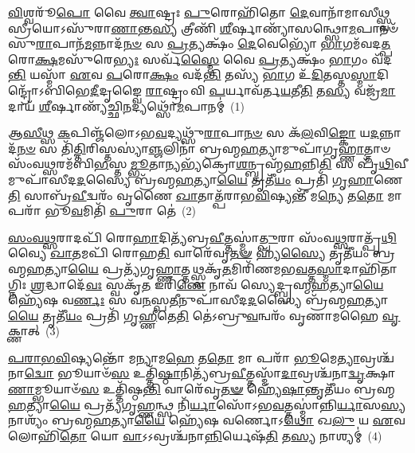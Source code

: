 \setcounter{anuvakam}{0}
\-\ul{𑌵𑌿}\-𑌶𑍍𑌵𑌰𑍂᳴\-\ul{𑌪𑍋} 𑌵𑍈 \ul{𑌤𑍍𑌵𑌾}\-𑌷𑍍𑌟𑍍𑌰𑌃 \ul{𑌪𑍁}\-𑌰𑍋𑌹𑌿᳴𑌤𑍋 \ul{𑌦𑍇}\-𑌵𑌾𑌨𑌾᳴𑌮𑌾𑌸𑍀\-\ul{𑌥𑍍𑌸𑍍𑌵}\-𑌸𑍍𑌰𑍀𑌯𑍋\-𑌽𑌸𑍁᳴𑌰𑌾\-\ul{𑌣𑌾}\-𑌨𑍍𑌤\-\ul{𑌸𑍍𑌯} 𑌤𑍍𑌰𑍀𑌣𑌿᳴ \ul{𑌶𑍀}\-𑌰𑍍\mbox{}𑌷𑌾𑌣𑍍𑌯𑌾᳴𑌸𑌨𑍍𑌥𑍍𑌸𑍋\-\ul{𑌮}\-𑌪𑌾𑌨𑍞᳴ 𑌸𑍁\-\ul{𑌰𑌾}\-𑌪𑌾𑌨᳴\-\ul{𑌮}\-𑌨𑍍𑌨𑌾𑌦᳴\-\ul{𑌨}\-\-\ul{𑍞} 𑌸 \ul{𑌪𑍍𑌰}\-𑌤𑍍𑌯𑌕𑍍𑌷𑌂᳴ \ul{𑌦𑍇}\-𑌵𑍇𑌭𑍍𑌯𑍋᳴ \ul{𑌭𑌾}\-𑌗𑌮᳴𑌵𑌦\-\ul{𑌤𑍍𑌪}\-𑌰𑍋\-\ul{𑌕𑍍𑌷}\-𑌮𑌸𑍁᳴𑌰𑍇\-\ul{𑌭𑍍𑌯𑌃} 𑌸𑌰𑍍𑌵᳴\-\ul{𑌸𑍍𑌮𑍈} 𑌵𑍈 \ul{𑌪𑍍𑌰}\-𑌤𑍍𑌯𑌕𑍍𑌷𑌂᳴ \ul{𑌭𑌾}\-𑌗𑌂 𑌵᳴𑌦\-\ul{𑌨𑍍𑌤𑌿} 𑌯𑌸𑍍𑌮𑌾᳴ \ul{𑌏}\-𑌵 \ul{𑌪}\-𑌰𑍋\-\ul{𑌕𑍍𑌷𑌂} 𑌵𑌦᳴\-\ul{𑌨𑍍𑌤𑌿} 𑌤𑌸𑍍𑌯᳴ \ul{𑌭𑌾}\-𑌗 𑌉᳴\-\ul{𑌦𑌿}\-𑌤𑌸𑍍𑌤\-\ul{𑌸𑍍𑌮𑌾}\-𑌦𑌿𑌨𑍍𑌦𑍍𑌰𑍋᳴\-𑌽𑌬𑌿𑌭𑍇\-\ul{𑌦𑍀}\-𑌦𑍃𑌙𑍍𑌵𑍈 \ul{𑌰𑌾}\-𑌷𑍍𑌟𑍍𑌰𑌂 𑌵𑌿 \ul{𑌪}\-𑌰𑍍𑌯𑌾𑌵᳴𑌰𑍍𑌤\-\ul{𑌯}\-𑌤𑍀\-\ul{𑌤𑌿} 𑌤\-\ul{𑌸𑍍𑌯} 𑌵𑌜𑍍𑌰᳴\-\ul{𑌮𑌾}\-𑌦𑌾𑌯᳴ \ul{𑌶𑍀}\-𑌰𑍍\mbox{}𑌷𑌾𑌣𑍍𑌯᳴𑌚𑍍𑌛𑌿\-\ul{𑌨}\-𑌦𑍍𑌯𑌥𑍍𑌸𑍋᳴\-\ul{𑌮}\-𑌪𑌾𑌨𑌮𑍍॑~(1)

𑌆\-\ul{𑌸𑍀}\-𑌥𑍍𑌸 \ul{𑌕}\-𑌪𑌿𑌞𑍍𑌜᳴𑌲𑍋\-𑌽𑌭\-\ul{𑌵}\-𑌦𑍍𑌯𑌥𑍍𑌸𑍁᳴\-\ul{𑌰𑌾}\-𑌪𑌾\-\ul{𑌨}\-\-\ul{𑍞} 𑌸 𑌕᳴\-\ul{𑌲}\-𑌵𑌿\-\ul{𑌙𑍍𑌕𑍋} 𑌯\-\ul{𑌦}\-𑌨𑍍𑌨𑌾𑌦᳴\-\ul{𑌨}\-\-\ul{𑍞} 𑌸 𑌤𑌿᳴\-\ul{𑌤𑍍𑌤𑌿}\-𑌰𑌿𑌸𑍍𑌤𑌸𑍍𑌯𑌾॑\-\ul{𑌞𑍍𑌜}\-𑌲𑌿𑌨𑌾॑ 𑌬𑍍𑌰𑌹𑍍𑌮\-\ul{𑌹}\-𑌤𑍍𑌯𑌾𑌮𑍁𑌪𑌾᳴𑌗𑍃\-\ul{𑌹𑍍𑌣𑌾}\-𑌤𑍍𑌤𑌾𑍞 𑌸𑌂᳴𑌵\-\ul{𑌥𑍍𑌸}\-𑌰𑌮᳴𑌬𑌿\-\ul{𑌭}\-𑌸𑍍𑌤\-\ul{𑌮𑍍𑌭𑍂}\-𑌤𑌾\-\ul{𑌨𑍍𑌯}\-𑌭𑍍𑌯᳴𑌕𑍍𑌰𑍋\-\ul{𑌶}\-𑌨𑍍𑌬𑍍𑌰𑌹𑍍𑌮᳴\-\ul{𑌹}\-𑌨𑍍𑌨𑌿\-\ul{𑌤𑌿} 𑌸 𑌪𑍃᳴\-\ul{𑌥𑌿}\-𑌵𑍀𑌮𑍁𑌪𑌾᳴𑌸𑍀𑌦\-\ul{𑌦}\-𑌸𑍍𑌯𑍈 𑌬𑍍𑌰᳴𑌹𑍍𑌮\-\ul{𑌹}\-𑌤𑍍𑌯𑌾\-\ul{𑌯𑍈} 𑌤𑍃𑌤𑍀᳴\-\ul{𑌯𑌂} 𑌪𑍍𑌰𑌤𑌿᳴ 𑌗𑍃\-\ul{𑌹𑌾}\-𑌣𑍇\-\ul{𑌤𑌿} 𑌸𑌾𑌬𑍍𑌰᳴\-\ul{𑌵𑍀}\-𑌦𑍍𑌵𑌰𑌂᳴ 𑌵𑍃𑌣𑍈 \ul{𑌖𑌾}\-𑌤𑌾𑌤𑍍𑌪᳴𑌰𑌾𑌭\-\ul{𑌵𑌿}\-𑌷𑍍𑌯𑌨𑍍𑌤𑍀᳴ 𑌮\-\ul{𑌨𑍍𑌯𑍇} 𑌤\-\ul{𑌤𑍋} 𑌮𑌾 𑌪𑌰𑌾᳴ 𑌭𑍂\-\ul{𑌵}\-𑌮𑌿𑌤𑌿᳴ \ul{𑌪𑍁}\-𑌰𑌾 𑌤𑍇॑~(2)

\-\ul{𑌸𑌂}\-\-\ul{𑌵}\-\-\ul{𑌥𑍍𑌸}\-𑌰𑌾𑌦𑌪𑌿᳴ 𑌰𑍋\-\ul{𑌹𑌾}\-𑌦𑌿𑌤𑍍𑌯᳴𑌬𑍍𑌰\-\ul{𑌵𑍀}\-𑌤𑍍𑌤𑌸𑍍𑌮𑌾॑\-\ul{𑌤𑍍𑌪𑍁}\-𑌰𑌾 𑌸𑌂᳴𑌵\-\ul{𑌥𑍍𑌸}\-𑌰𑌾𑌤𑍍𑌪𑍃᳴\-\ul{𑌥𑌿}\-𑌵𑍍𑌯𑍈 \ul{𑌖𑌾}\-𑌤𑌮𑌪𑌿᳴ 𑌰𑍋𑌹\-\ul{𑌤𑌿} 𑌵𑌾𑌰𑍇᳴𑌵𑍃\-\ul{𑌤}\-\-\ul{𑍟} 𑌹𑍍𑌯᳴\-\ul{𑌸𑍍𑌯𑍈} 𑌤𑍃𑌤𑍀᳴𑌯𑌂 𑌬𑍍𑌰𑌹𑍍𑌮\-\ul{𑌹}\-𑌤𑍍𑌯𑌾\-\ul{𑌯𑍈} 𑌪𑍍𑌰𑌤𑍍𑌯᳴𑌗𑍃\-\ul{𑌹𑍍𑌣𑌾}\-𑌤𑍍𑌤𑌥𑍍𑌸𑍍𑌵𑌕𑍃᳴\-\ul{𑌤}\-𑌮𑌿𑌰𑌿᳴𑌣𑌮𑌭\-\ul{𑌵}\-𑌤𑍍𑌤\-\ul{𑌸𑍍𑌮𑌾}\-𑌦𑌾𑌹𑌿᳴𑌤𑌾𑌗𑍍𑌨𑌿𑌃 \ul{𑌶𑍍𑌰}\-𑌦𑍍𑌧𑌾𑌦𑍇᳴\-\ul{𑌵𑌃} 𑌸𑍍𑌵𑌕𑍃᳴\-\ul{𑌤} 𑌇𑌰𑌿᳴\-\ul{𑌣𑍇} 𑌨𑌾𑌵᳴ 𑌸𑍍𑌯𑍇𑌦𑍍𑌬𑍍𑌰𑌹𑍍𑌮\-\ul{𑌹}\-𑌤𑍍𑌯𑌾\-\ul{𑌯𑍈} 𑌹𑍍𑌯𑍇᳴𑌷 𑌵\-\ul{𑌰𑍍𑌣𑌃} 𑌸 𑌵\-\ul{𑌨}\-𑌸𑍍𑌪\-\ul{𑌤𑍀}\-𑌨𑍁𑌪𑌾᳴𑌸𑍀𑌦\-\ul{𑌦}\-𑌸𑍍𑌯𑍈 𑌬𑍍𑌰᳴𑌹𑍍𑌮\-\ul{𑌹}\-𑌤𑍍𑌯𑌾\-\ul{𑌯𑍈} 𑌤𑍃𑌤𑍀᳴\-\ul{𑌯𑌂} 𑌪𑍍𑌰𑌤𑌿᳴ 𑌗𑍃\-\ul{𑌹𑍍𑌣𑍀}\-𑌤𑍇\-\ul{𑌤𑌿} 𑌤𑍇॑\-𑌽𑌬𑍍𑌰𑍁\-\ul{𑌵}\-𑌨𑍍𑌵𑌰𑌂᳴ 𑌵𑍃𑌣𑌾𑌮𑌹𑍈 \ul{𑌵𑍃}\-𑌕𑍍𑌣𑌾𑌤𑍍~(3)

\-\ul{𑌪}\-\-\ul{𑌰𑌾}\-\-\ul{𑌭}\-\-\ul{𑌵𑌿}\-𑌷𑍍𑌯𑌨𑍍𑌤𑍋᳴ 𑌮𑌨𑍍𑌯𑌾𑌮\-\ul{𑌹𑍇} 𑌤\-\ul{𑌤𑍋} 𑌮𑌾 𑌪𑌰𑌾᳴ \ul{𑌭𑍂}\-𑌮𑍇\-\ul{𑌤𑍍𑌯𑌾}\-𑌵𑍍𑌰𑌶𑍍𑌚᳴𑌨𑌾\-\ul{𑌦𑍍𑌵𑍋} 𑌭𑍂𑌯𑌾𑍞᳴\-\ul{𑌸} 𑌉𑌤𑍍𑌤𑌿᳴\-\ul{𑌷𑍍𑌠𑌾}\-𑌨𑌿𑌤𑍍𑌯᳴𑌬𑍍𑌰\-\ul{𑌵𑍀}\-𑌤𑍍𑌤𑌸𑍍𑌮𑌾᳴\-\ul{𑌦𑌾}\-𑌵𑍍𑌰𑌶𑍍𑌚᳴𑌨𑌾\-\ul{𑌦𑍍𑌵𑍃}\-𑌕𑍍𑌷𑌾\-\ul{𑌣𑌾}\-𑌮𑍍𑌭𑍂𑌯𑌾𑍞᳴\-\ul{𑌸} 𑌉𑌤𑍍𑌤𑌿᳴𑌷𑍍𑌠\-\ul{𑌨𑍍𑌤𑌿} 𑌵𑌾𑌰𑍇᳴𑌵𑍃\-\ul{𑌤}\-\-\ul{𑍟} 𑌹𑍍𑌯𑍇᳴\-\ul{𑌷𑌾}\-𑌨𑍍𑌤𑍃𑌤𑍀᳴𑌯𑌂 𑌬𑍍𑌰𑌹𑍍𑌮\-\ul{𑌹}\-𑌤𑍍𑌯𑌾\-\ul{𑌯𑍈} 𑌪𑍍𑌰𑌤𑍍𑌯᳴𑌗𑍃\-\ul{𑌹𑍍𑌣}\-𑌨𑍍𑌥𑍍𑌸 𑌨𑌿᳴\-\ul{𑌰𑍍𑌯𑌾}\-𑌸𑍋᳴\-𑌽𑌭\-\ul{𑌵}\-𑌤𑍍𑌤𑌸𑍍𑌮𑌾॑𑌨𑍍𑌨𑌿\-\ul{𑌰𑍍𑌯𑌾}\-𑌸\-\ul{𑌸𑍍𑌯} 𑌨𑌾𑌶𑍍𑌯𑌂᳴ 𑌬𑍍𑌰𑌹𑍍𑌮\-\ul{𑌹}\-𑌤𑍍𑌯𑌾\-\ul{𑌯𑍈} 𑌹𑍍𑌯𑍇᳴𑌷 𑌵𑌰𑍍𑌣𑍋\-𑌽\-\ul{𑌥𑍋} 𑌖\-\ul{𑌲𑍁} 𑌯 \ul{𑌏}\-𑌵 𑌲𑍋𑌹𑌿᳴\-\ul{𑌤𑍋} 𑌯𑍋 \ul{𑌵𑌾}\-\-𑌽\-𑌽𑌵𑍍𑌰𑌶𑍍𑌚᳴𑌨𑌾\-\ul{𑌨𑍍𑌨𑌿}\-𑌰𑍍𑌯𑍇𑌷᳴\-\ul{𑌤𑌿} 𑌤\-\ul{𑌸𑍍𑌯} 𑌨𑌾𑌶𑍍𑌯𑌮𑍍॑~(4)

